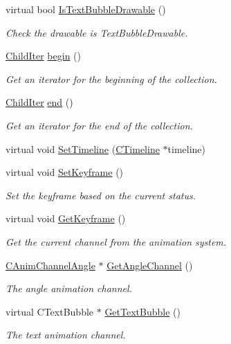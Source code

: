 \begin{DoxyCompactItemize}
virtual bool \hyperlink{class_c_drawable_a43bc0016ffe1bfe22f5b97730c431514}{Is\+Text\+Bubble\+Drawable} ()
\begin{DoxyCompactList}\small\item\em Check the drawable is Text\+Bubble\+Drawable. \end{DoxyCompactList}\item 
\hyperlink{class_c_drawable_1_1_child_iter}{Child\+Iter} \hyperlink{class_c_drawable_a8a369d10744f4139f8d39da8806fb4be}{begin} ()
\begin{DoxyCompactList}\small\item\em Get an iterator for the beginning of the collection. \end{DoxyCompactList}\item 
\hyperlink{class_c_drawable_1_1_child_iter}{Child\+Iter} \hyperlink{class_c_drawable_a44ad4b912b744487eb0bac2328e86336}{end} ()
\begin{DoxyCompactList}\small\item\em Get an iterator for the end of the collection. \end{DoxyCompactList}\item 
virtual void \hyperlink{class_c_drawable_a479df46ae298bf716d96b05b1ba6e529}{Set\+Timeline} (\hyperlink{class_c_timeline}{C\+Timeline} $\ast$timeline)
\item 
\hypertarget{class_c_drawable_acd0be14f2f8666ce8f57db68dd220308}{virtual void \hyperlink{class_c_drawable_acd0be14f2f8666ce8f57db68dd220308}{Set\+Keyframe} ()}\label{class_c_drawable_acd0be14f2f8666ce8f57db68dd220308}

\begin{DoxyCompactList}\small\item\em Set the keyframe based on the current status. \end{DoxyCompactList}\item 
\hypertarget{class_c_drawable_aad6d3c8e4c1ad3715c8aa56e2a83977d}{virtual void \hyperlink{class_c_drawable_aad6d3c8e4c1ad3715c8aa56e2a83977d}{Get\+Keyframe} ()}\label{class_c_drawable_aad6d3c8e4c1ad3715c8aa56e2a83977d}

\begin{DoxyCompactList}\small\item\em Get the current channel from the animation system. \end{DoxyCompactList}\item 
\hyperlink{class_c_anim_channel_angle}{C\+Anim\+Channel\+Angle} $\ast$ \hyperlink{class_c_drawable_a14665f0fbbfa93bb349f7993a7af5de4}{Get\+Angle\+Channel} ()
\begin{DoxyCompactList}\small\item\em The angle animation channel. \end{DoxyCompactList}\item 
virtual C\+Text\+Bubble $\ast$ \hyperlink{class_c_drawable_ac271ee6f71e550946b5da8f27d0ff6be}{Get\+Text\+Bubble} ()
\begin{DoxyCompactList}\small\item\em The text animation channel. \end{DoxyCompactList}\end{DoxyCompactItemize}
